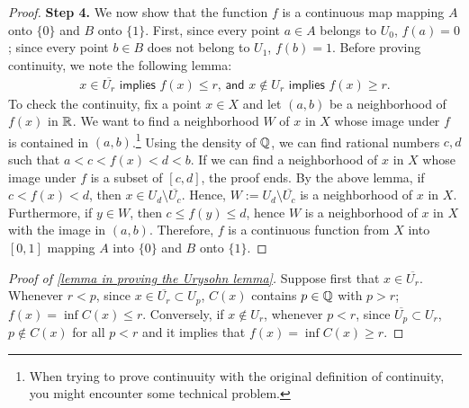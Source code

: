 \begin{proof}
    \textbf{Step 4.}
    We now show that the function $f$ is a continuous map mapping $A$ onto $\{0\}$ and $B$ onto $\{1\}$.
    First, since every point $a\in A$ belongs to $U_0$, $f(a)=0$; since every point $b\in B$ does not belong to $U_1$, $f(b)=1$.
    Before proving continuity, we note the following lemma:
    \begin{align}\label{lemma in proving the Urysohn lemma}
        \textsf{$x\in\overline{U_r}$ implies $f(x)\leq r$, and $x\notin U_r$ implies $f(x)\geq r$.}
    \end{align}
    To check the continuity, fix a point $x\in X$ and let $(a, b)$ be a neighborhood of $f(x)$ in ${\mathbb{R}}$.
    We want to find a neighborhood $W$ of $x$ in $X$ whose image under $f$ is contained in $(a, b)$.\footnote{When trying to prove continuuity with the original definition of continuity, you might encounter some technical problem.}
    Using the density of ${\mathbb{Q}}$, we can find rational numbers $c, d$ such that $a<c<f(x)<d<b$.
    If we can find a neighborhood of $x$ in $X$ whose image under $f$ is a subset of $[c, d]$, the proof ends.
    By the above lemma, if $c<f(x)<d$, then $x\in U_d\setminus\overline{U_c}$.
    Hence, $W:=U_d\setminus\overline{U_c}$ is a neighborhood of $x$ in $X$.
    Furthermore, if $y\in W$, then $c\leq f(y)\leq d$, hence $W$ is a neighborhood of $x$ in $X$ with the image in $(a, b)$.
    Therefore, $f$ is a continuous function from $X$ into $[0, 1]$ mapping $A$ into $\{0\}$ and $B$ onto $\{1\}$.
\end{proof}
\begin{proof}[Proof of \cref{lemma in proving the Urysohn lemma}]
    Suppose first that $x\in\overline{U_r}$.
    Whenever $r<p$, since $x\in\overline{U_r}\subset U_p$, $C(x)$ contains $p\in{\mathbb{Q}}$ with $p>r$; $f(x)=\inf C(x)\leq r$.
    Conversely, if $x\notin U_r$, whenever $p<r$, since $\overline{U_p}\subset U_r$, $p\notin C(x)$ for all $p<r$ and it implies that $f(x)=\inf C(x)\geq r$.
\end{proof}

